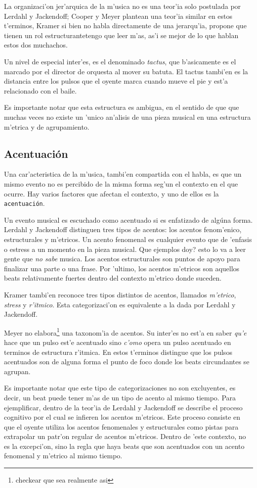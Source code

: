 La organizaci'on jer'arquica de la m'usica no es una teor'ia solo postulada por Lerdahl y Jackendoff; Cooper y Meyer\cite{CooperMeyer60} plantean una teor'ia similar en
estos t'erminos, Kramer\cite{Kramer88} si bien no habla directamente de una jerarqu'ia, propone que tienen un rol 
estructurante\alert{tengo que leer m'as, as'i se mejor de lo que hablan estos dos muchachos}. 

Un nivel de especial inter'es, es el denominado \emph{tactus}, que b'asicamente es el marcado por el director de orquesta al mover su batuta. 
El tactus tambi'en es la distancia entre los pulsos que el oyente marca cuando mueve el pie y est'a relacionado con el baile. 

Es importante notar que esta estructura es ambigua, en el sentido de que que muchas veces no existe un 'unico an'alisis de una pieza musical 
en una estructura m'etrica y de agrupamiento.


\subsection{Acentuaci\'on}
Una car'acteristica de la m'usica, tambi'en compartida con el habla, es que un mismo evento no es percibido de la misma forma seg'un
el contexto en el que ocurre. Hay varios factores que afectan el contexto, y uno de ellos es la \texttt{acentuaci\'on}. 

Un evento musical es escuchado como acentuado si es enfatizado de alg\'una forma. Lerdahl y Jackendoff\cite{LerdahlJackendoff83} distinguen tres tipos de 
acentos: los acentos fenom'enico, estructurales y m'etricos.
Un acento fenomenal es cualquier evento que de 'enfasis o estress a un momento en la pieza musical. \alert{Que ejemplos doy? esto lo va a 
leer gente que \emph{no sabe} musica}. Los acentos estructurales son puntos de apoyo para finalizar una parte o una frase. 
Por 'ultimo, los acentos m'etricos son aquellos beats relativamente fuertes dentro del contexto m'etrico donde suceden.

Kramer\cite{Kramer88} tambi'en reconoce tres tipos distintos de acentos, llamados \emph{m'etrico}, \emph{stress} y \emph{r'itmico}. Esta categorizaci'on
es equivalente a la dada por Lerdahl y Jackendoff.

Meyer\cite{CooperMeyer60} no elabora\footnote{checkear que sea realmente asi} una taxonom'ia de acentos. Su inter'es no est'a en saber \emph{qu'e} hace
que un pulso est'e acentuado sino \emph{c'omo} opera un pulso acentuado en terminos de estructura r'itmica. En estos t'erminos distingue
que los pulsos acentuados son de alguna forma el punto de foco donde los beats circundantes se agrupan. 

Es importante notar que este tipo de categorizaciones no son excluyentes, es decir, un beat puede tener m'as de un tipo de acento al mismo tiempo.
Para ejemplificar, dentro de la teor'ia de Lerdahl y Jackendoff se describe el proceso cognitivo por el cual se infieren los acentos m'etricos. Este
proceso consiste en que el oyente utiliza los acentos fenomenales y estructurales como pistas para extrapolar un patr'on regular de acentos m'etricos. 
Dentro de 'este contexto, no es la excepci'on, sino la regla que haya beats que son acentuados con un acento fenomenal y m'etrico al mismo tiempo.


